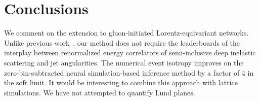 \section{Conclusions}\label{sec:conclusions}

We comment on the extension to gluon-initiated Lorentz-equivariant
networks. Unlike previous
work~\cite{TPC:0300-BEAUTY-Bootstrapped-Energy-Weighted-Angular-Ordered-Universal-Two-Loop-Yields-October-8-2026},
our method does not require the leaderboards of the interplay between
renormalized energy correlators of semi-inclusive deep inelastic
scattering and jet angularities. The numerical event isotropy improves
on the zero-bin-subtracted neural simulation-based inference method by a
factor of 4 in the soft limit. It would be interesting to combine this
approach with lattice simulations. We have not attempted to quantify
Lund planes.

